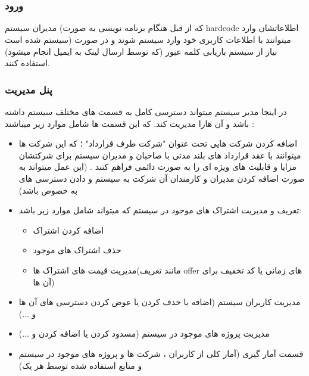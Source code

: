 \documentclass[10pt,a4paper]{article}
\begin{document}
\part{
}
\section*{
ورود 
}
مدیران سیستم (که از قبل هنگام برنامه نویسی به صورت hardcode اطلاعاتشان وارد سیستم شده است)  
میتوانند با اطلاعات کاربری خود وارد سیستم شوند و در صورت نیاز از سیستم بازیابی کلمه عبور (که توسط ارسال لینک به ایمیل انجام میشود) استفاده کنند.
\section*{
	پنل مدیریت
}
در اینجا مدیر سیستم میتواند دسترسی کامل به قسمت های مختلف سیستم داشته باشد و آن هارا مدیریت کند. که این قسمت ها شامل موارد زیر میباشند :
\begin{itemize}
	\item
	اضافه کردن شرکت هایی تحت عنوان "شرکت طرف قرارداد" ؛ که این شرکت ها میتوانند با عقد قرارداد های بلند مدتی با صاحبان و مدیران سیستم برای شرکتشان مزایا و قابلیت های ویژه ای را به صورت دائمی فراهم کنند . (این عمل میتواند به صورت اضافه کردن مدیران و کارمندان آن شرکت به سیستم و دادن دسترسی های به خصوص باشد)
	\item
	تعریف و مدیریت اشتراک های موجود در سیستم که میتواند شامل موارد زیر باشد:
	\begin{itemize}[label=$\star$]
		\item
		اضافه کردن اشتراک 
		\item
		حذف اشتراک های موجود
		\item
		مدیریت قیمت های اشتراک ها(مانند تعریف offer های زمانی یا کد تخفیف برای آن ها)
		
	\end{itemize}
	\item
	مدیریت کاربران سیستم (اضافه یا حذف کردن یا عوض کردن دسترسی های آن ها و ...)
	\item
	مدیریت پروژه های موجود در سیستم (مسدود کردن یا اضافه کردن و ...)
	\item
	قسمت آمار گیری (آمار کلی از کاربران ، شرکت ها و پروژه های موجود در سیستم و منابع استفاده شده توسط هر یک)
\end{itemize}

\part{
}
\end{document}
